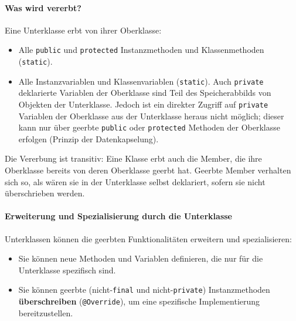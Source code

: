 \paragraph{Was wird vererbt?}
Eine Unterklasse erbt von ihrer Oberklasse:
\begin{itemize}
    \item Alle \texttt{public} und \texttt{protected} Instanzmethoden und Klassenmethoden (\texttt{static}).
    \item Alle Instanzvariablen und Klassenvariablen (\texttt{static}). Auch \texttt{private} deklarierte Variablen der Oberklasse sind 
    Teil des Speicherabbilds von Objekten der Unterklasse. Jedoch ist ein direkter Zugriff auf \texttt{private} Variablen der Oberklasse 
    aus der Unterklasse heraus nicht möglich; dieser kann nur über geerbte \texttt{public} oder \texttt{protected} Methoden der Oberklasse 
    erfolgen (Prinzip der Datenkapselung).
\end{itemize}
Die Vererbung ist transitiv: Eine Klasse erbt auch die Member, die ihre Oberklasse bereits von deren Oberklasse geerbt hat. Geerbte Member 
verhalten sich so, als wären sie in der Unterklasse selbst deklariert, sofern sie nicht überschrieben werden.

\paragraph{Erweiterung und Spezialisierung durch die Unterklasse}
Unterklassen können die geerbten Funktionalitäten erweitern und spezialisieren:
\begin{itemize}
    \item Sie können neue Methoden und Variablen definieren, die nur für die Unterklasse spezifisch sind.
    \item Sie können geerbte (nicht-\texttt{final} und nicht-\texttt{private}) Instanzmethoden \textbf{überschreiben} (\texttt{@Override}), 
    um eine spezifische Implementierung bereitzustellen.
\end{itemize}

